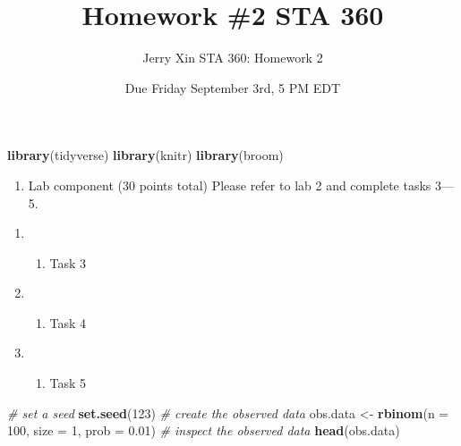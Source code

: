 \documentclass[
]{article}
\title{Homework \#2 STA 360}
\author{Jerry Xin STA 360: Homework 2}
\date{Due Friday September 3rd, 5 PM EDT}
\newenvironment{Shaded}{\begin{snugshade}}{\end{snugshade}}
\newcommand{\CommentTok}[1]{\textcolor[rgb]{0.56,0.35,0.01}{\textit{#1}}}
\newcommand{\DataTypeTok}[1]{\textcolor[rgb]{0.13,0.29,0.53}{#1}}
\newcommand{\DecValTok}[1]{\textcolor[rgb]{0.00,0.00,0.81}{#1}}
\newcommand{\FloatTok}[1]{\textcolor[rgb]{0.00,0.00,0.81}{#1}}
\newcommand{\KeywordTok}[1]{\textcolor[rgb]{0.13,0.29,0.53}{\textbf{#1}}}
\newcommand{\NormalTok}[1]{#1}
\newcommand{\StringTok}[1]{\textcolor[rgb]{0.31,0.60,0.02}{#1}}
\providecommand{\tightlist}{%
  \setlength{\itemsep}{0pt}\setlength{\parskip}{0pt}}
\begin{document}
\maketitle

\begin{Shaded}
\begin{Highlighting}[]
\KeywordTok{library}\NormalTok{(tidyverse)}
\KeywordTok{library}\NormalTok{(knitr)}
\KeywordTok{library}\NormalTok{(broom)}
\end{Highlighting}
\end{Shaded}

\begin{enumerate}
\def\labelenumi{\arabic{enumi}.}
\tightlist
\item
  Lab component (30 points total) Please refer to lab 2 and complete
  tasks 3---5.
\end{enumerate}

\begin{enumerate}
\def\labelenumi{(\alph{enumi})}
\item
  \begin{enumerate}
  \def\labelenumii{(\arabic{enumii})}
  \setcounter{enumii}{9}
  \tightlist
  \item
    Task 3
  \end{enumerate}
\item
  \begin{enumerate}
  \def\labelenumii{(\arabic{enumii})}
  \setcounter{enumii}{9}
  \tightlist
  \item
    Task 4
  \end{enumerate}
\item
  \begin{enumerate}
  \def\labelenumii{(\arabic{enumii})}
  \setcounter{enumii}{9}
  \tightlist
  \item
    Task 5
  \end{enumerate}
\end{enumerate}

\begin{Shaded}
\begin{Highlighting}[]
\CommentTok{# set a seed}
\KeywordTok{set.seed}\NormalTok{(}\DecValTok{123}\NormalTok{)}
\CommentTok{# create the observed data}
\NormalTok{obs.data <-}\StringTok{ }\KeywordTok{rbinom}\NormalTok{(}\DataTypeTok{n =} \DecValTok{100}\NormalTok{, }\DataTypeTok{size =} \DecValTok{1}\NormalTok{, }\DataTypeTok{prob =} \FloatTok{0.01}\NormalTok{)}
\CommentTok{# inspect the observed data}
\KeywordTok{head}\NormalTok{(obs.data)}
\end{Highlighting}
\end{Shaded}
\end{document}
